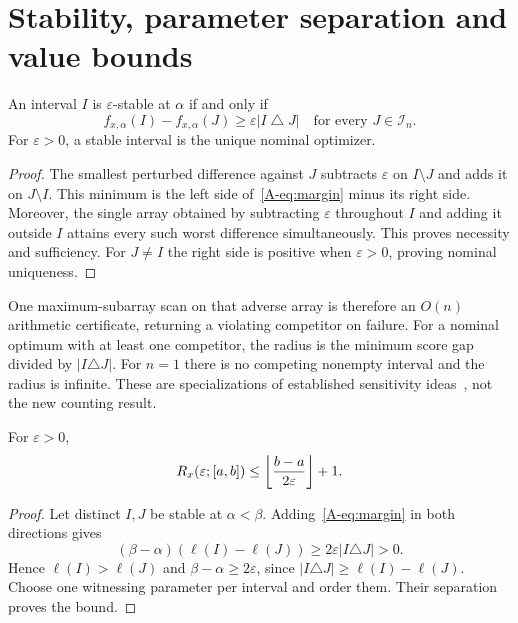 \section{Stability, parameter separation and value bounds}
\begin{lemma}\label{A-lem:box}
An interval $I$ is $\varepsilon$-stable at $\alpha$ if and only if
\begin{equation}\label{A-eq:margin}
f_{x,\alpha}(I)-f_{x,\alpha}(J)\ge\varepsilon|I\mathbin{\triangle}J|
\quad\text{for every }J\in\mathcal I_n.
\end{equation}
For $\varepsilon>0$, a stable interval is the unique nominal optimizer.
\end{lemma}
\begin{proof}
The smallest perturbed difference against $J$ subtracts $\varepsilon$ on $I\setminus J$ and adds it on $J\setminus I$. This minimum is the left side of~\eqref{A-eq:margin} minus its right side. Moreover, the single array obtained by subtracting $\varepsilon$ throughout $I$ and adding it outside $I$ attains every such worst difference simultaneously. This proves necessity and sufficiency. For $J\ne I$ the right side is positive when $\varepsilon>0$, proving nominal uniqueness.
\end{proof}
One maximum-subarray scan on that adverse array is therefore an $O(n)$ arithmetic certificate, returning a violating competitor on failure. For a nominal optimum with at least one competitor, the radius is the minimum score gap divided by $|I\triangle J|$. For $n=1$ there is no competing nonempty interval and the radius is infinite. These are specializations of established sensitivity ideas~\cite{chak}, not the new counting result.

\begin{proposition}\label{A-prop:packing}
For $\varepsilon>0$,
\begin{equation}\label{A-eq:packing}
R_x(\varepsilon;[a,b])\le\left\lfloor \frac{b-a}{2\varepsilon}\right\rfloor+1.
\end{equation}
\end{proposition}
\begin{proof}
Let distinct $I,J$ be stable at $\alpha<\beta$. Adding~\eqref{A-eq:margin} in both directions gives
\begin{equation}\label{A-eq:separation}
(\beta-\alpha)(\ell(I)-\ell(J))\ge2\varepsilon|I\triangle J|>0.
\end{equation}
Hence $\ell(I)>\ell(J)$ and $\beta-\alpha\ge2\varepsilon$, since $|I\triangle J|\ge\ell(I)-\ell(J)$. Choose one witnessing parameter per interval and order them. Their separation proves the bound.
\end{proof}

